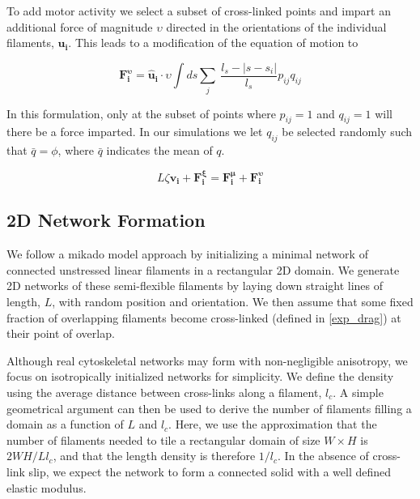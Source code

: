 \documentclass[10pt,letterpaper]{article}
\begin{document}
To add motor activity we select a subset of cross-linked points and impart an additional force of magnitude $\upsilon$ directed in the orientations of the individual filaments, $\mathbf{u_i}$.  This leads to a modification of the equation of motion to

\begin{equation}
\label{eqn:syst}
\mathbf{F^{\upsilon}_i}= \mathbf{\hat{u}_i}\cdot\upsilon\int ds \sum _j \:  \frac{l_s-|s-s_i|}{l_s} p_{ij}q_{ij}
\end{equation}



In this formulation, only at the subset of points where  $p_{ij}=1$ and $q_{ij}=1$ will there be a force imparted.  In our simulations we let $q_{ij}$ be selected randomly such that $\bar{q}=\phi$, where $\bar{q}$ indicates the mean of $q$.

\begin{equation}
\label{eqn:syst}
L\zeta\mathbf{ v_i} +\mathbf{F^{\xi}_i}= \mathbf{F^{\mu}_i}+\mathbf{F^{\upsilon}_i}
\end{equation}

\subsection*{2D Network Formation}

We follow a mikado model approach by initializing a minimal network of connected unstressed linear filaments in a rectangular 2D domain.  We generate 2D networks of these semi-flexible filaments by laying down straight lines of length, $L$, with random position and orientation. We then assume that some fixed fraction of overlapping filaments become cross-linked (defined in \ref{exp_drag}) at their point of overlap.

Although real cytoskeletal networks may form with non-negligible anisotropy,  we  focus on isotropically initialized networks for simplicity.  We define the density using the average distance between cross-links along a filament, $l_c$. A simple geometrical argument can then be used to derive the number of filaments filling a domain as a function of $L$ and $l_c$\cite{theo_hlm}.  Here, we use the approximation that the number of filaments needed to tile a rectangular domain of size $W \times H$  is $2WH/Ll_c$, and that the length density is therefore $1/l_c$. In the absence of cross-link slip, we expect the network to form a connected solid with a well defined elastic modulus\cite{theo_hlm,theo_hlm2}.  
\end{document}

